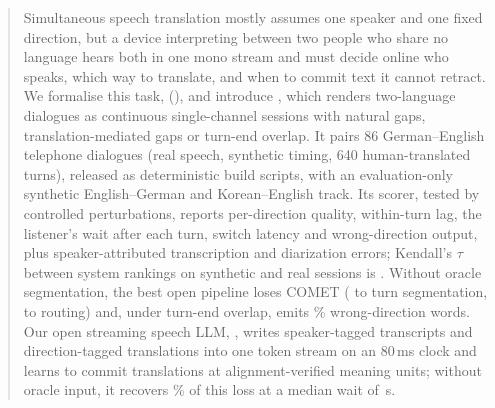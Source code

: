 \begin{abstract}
Simultaneous speech translation mostly assumes one speaker and one fixed direction, but a device interpreting between two people who share no language hears both in one mono stream and must decide online who speaks, which way to translate, and when to commit text it cannot retract.
We formalise this task, \taskfull (\task), and introduce \bench, which renders two-language dialogues as continuous single-channel sessions with natural gaps, translation-mediated gaps or turn-end overlap.
It pairs 86 German--English telephone dialogues (real speech, synthetic timing, 640 human-translated turns), released as deterministic build scripts, with an evaluation-only synthetic English--German and Korean--English track.
Its scorer, tested by controlled perturbations, reports per-direction quality, within-turn lag, the listener's wait after each turn, switch latency and wrong-direction output, plus speaker-attributed transcription and diarization errors; Kendall's $\tau$ between system rankings on synthetic and real sessions is \tbdtext{}.
Without oracle segmentation, the best open pipeline loses \tbdtext{} COMET (\tbdtext{} to turn segmentation, \tbdtext{} to routing) and, under turn-end overlap, emits \tbdtext{}\% wrong-direction words.
Our open streaming speech LLM, \model, writes speaker-tagged transcripts and direction-tagged translations into one token stream on an 80\,ms clock and learns to commit translations at alignment-verified meaning units; without oracle input, it recovers \tbdtext{}\% of this loss at a median wait of \tbdtext{}\,s.
\end{abstract}

